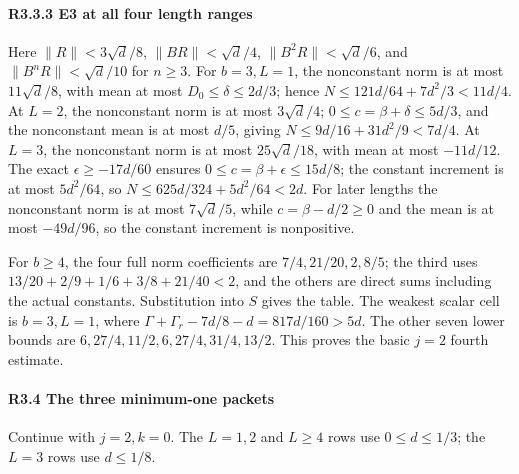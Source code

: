 \paragraph{R3.3.3 E3 at all four length ranges}

Here \(\|R\|<3\sqrt d/8\), \(\|BR\|<\sqrt d/4\), \(\|B^2R\|<\sqrt d/6\), and \(\|B^nR\|<\sqrt d/10\) for \(n\ge3\). For \(b=3,\allowbreak \allowbreak  L=1\), the nonconstant norm is at most \(11\sqrt d/8\), with mean at most \(D_0\le\delta\le2d/3\); hence \(N\le121d/64+7d^2/3<11d/4\). At \(L=2\), the nonconstant norm is at most \(3\sqrt d/4\); \(0\le c=\beta+\delta\le5d/3\), and the nonconstant mean is at most \(d/5\), giving \(N\le9d/16+31d^2/9<7d/4\). At \(L=3\), the nonconstant norm is at most \(25\sqrt d/18\), with mean at most \(-11d/12\). The exact \(\epsilon\ge-17d/60\) ensures \(0\le c=\beta+\epsilon\le15d/8\); the constant increment is at most \(5d^2/64\), so \(N\le625d/324+5d^2/64<2d\). For later lengths the nonconstant norm is at most \(7\sqrt d/5\), while \(c=\beta-d/2\ge0\) and the mean is at most \(-49d/96\), so the constant increment is nonpositive.

For \(b\ge4\), the four full norm coefficients are \(7/4,\allowbreak \allowbreak  21/20,\allowbreak \allowbreak  2,\allowbreak \allowbreak  8/5\); the third uses \(13/20+2/9+1/6+3/8+21/40<2\), and the others are direct sums including the actual constants. Substitution into \(S\) gives the table. The weakest scalar cell is \(b=3,\allowbreak \allowbreak  L=1\), where \(\Gamma+\Gamma_r-7d/8-d=817d/160>5d\). The other seven lower bounds are \(6,\allowbreak \allowbreak  27/4,\allowbreak \allowbreak  11/2,\allowbreak \allowbreak  6,\allowbreak \allowbreak  27/4,\allowbreak \allowbreak  31/4,\allowbreak \allowbreak  13/2\). This proves the basic \(j=2\) fourth estimate.

\paragraph{R3.4 The three minimum-one packets}

Continue with \(j=2,\allowbreak \allowbreak  k=0\). The \(L=1,\allowbreak \allowbreak  2\) and \(L\ge4\) rows use \(0\le d\le1/3\); the \(L=3\) rows use \(d\le1/8\).


